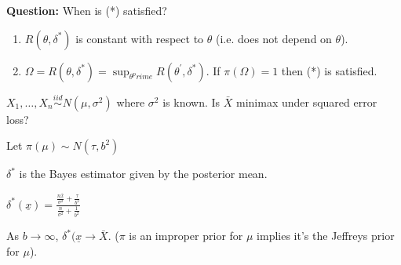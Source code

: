 \documentclass[11pt,fleqn]{book} %
\begin{document}
\textbf{Question:} When is (*) satisfied?
\begin{enumerate}
	\item $R(\theta, \delta^*)$ is constant with respect to $\theta$ (i.e. does not depend on $\theta$).
	\item $\Omega = {R(\theta, \delta^*) = \sup_{\theta^prime} R(\theta^\prime, \delta^*)}$. If $\pi(\Omega) = 1$ then (*) is satisfied.
\end{enumerate}

\begin{example}
	$X_1, \dots, X_n \stackrel{iid}{\sim} N(\mu, \sigma^2)$ where $\sigma^2$ is known. Is $\bar{X}$ minimax under squared error loss?

	 Let $\pi (\mu) \sim N(\tau, b^2)$

	$\delta^*$ is the Bayes estimator given by the posterior mean. 

	$\delta^*(\underline{x}) = \frac{\frac{n \bar{x}}{\sigma^2} + \frac{\tau}{b^2}}{\frac{n}{\sigma^2} + \frac{1}{b^2}}$

	As $b \rightarrow \infty$, $\delta^*(\underline{x} \rightarrow \bar{X}$. ($\pi$ is an improper prior for $\mu$ implies it's the Jeffreys prior for $\mu$).


\end{example}
\end{document}
